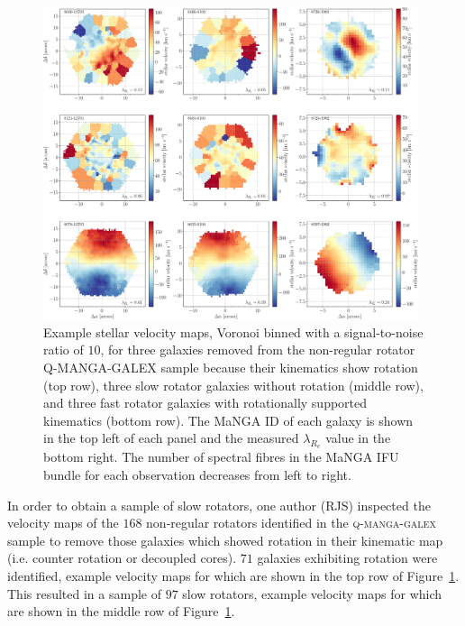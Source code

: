 \documentclass[useAMS,usenatbib]{mn2e}
\begin{document}
\begin{figure}
\centering
\includegraphics[width=0.98\textwidth]{../figures/proper_large_velmap_9_gal_aligned_ifu_bundles-MAPS-VOR10-GAU-MILESHC.pdf}
\caption{Example stellar velocity maps, Voronoi binned with a signal-to-noise ratio of $10$, for three galaxies removed from the non-regular rotator \textsc{Q-MANGA-GALEX} sample because their kinematics show rotation (top row), three slow rotator galaxies without rotation (middle row), and three fast rotator galaxies with rotationally supported kinematics (bottom row). The MaNGA ID of each galaxy is shown in the top left of each panel and the measured $\lambda_{R_{e}}$ value in the bottom right. The number of spectral fibres in the MaNGA IFU bundle for each observation decreases from left to right.}
\label{fig:exvelmaps}
\end{figure}  

In order to obtain a sample of slow rotators, one author (RJS) inspected the velocity maps of the $168$ non-regular rotators identified in the \textsc{q-manga-galex} sample to remove those galaxies which showed rotation in their kinematic map (i.e. counter rotation or decoupled cores). $71$ galaxies exhibiting rotation were identified, example velocity maps for which are shown in the top row of Figure~\ref{fig:exvelmaps}. This resulted in a sample of $97$ slow rotators, example velocity maps for which are shown in the middle row of Figure~\ref{fig:exvelmaps}.  
\end{document}
